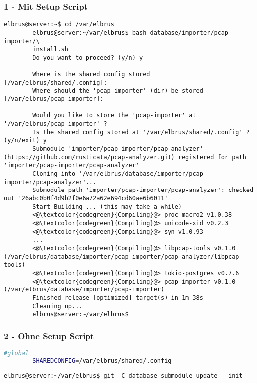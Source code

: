 \documentclass{article}
\begin{document}
	\subsubsection{1 - Mit Setup Script}
	\begin{lstlisting}[caption={Ausführen des 'install.sh' Scripts.}, breaklines=true,]
		elbrus@server:~$ cd /var/elbrus
		elbrus@server:~/var/elbrus$ bash database/importer/pcap-importer/\
		install.sh
		Do you want to proceed? (y/n) y
		
		Where is the shared config stored [/var/elbrus/shared/.config]: 
		Where should the 'pcap-importer' (dir) be stored [/var/elbrus/pcap-importer]: 
		
		Would you like to store the 'pcap-importer' at '/var/elbrus/pcap-importer' ?
		Is the shared config stored at '/var/elbrus/shared/.config' ? (y/n/exit) y
		Submodule 'importer/pcap-importer/pcap-analyzer' (https://github.com/rusticata/pcap-analyzer.git) registered for path 'importer/pcap-importer/pcap-analyzer'
		Cloning into '/var/elbrus/database/importer/pcap-importer/pcap-analyzer'...
		Submodule path 'importer/pcap-importer/pcap-analyzer': checked out '26abc0b0f4d9b2f0e6a72a62e694cd60ae6b6011'
		Start Building ... (this may take a while)
		<@\textcolor{codegreen}{Compiling}@> proc-macro2 v1.0.38
		<@\textcolor{codegreen}{Compiling}@> unicode-xid v0.2.3
		<@\textcolor{codegreen}{Compiling}@> syn v1.0.93
		...
		<@\textcolor{codegreen}{Compiling}@> libpcap-tools v0.1.0 (/var/elbrus/database/importer/pcap-importer/pcap-analyzer/libpcap-tools)
		<@\textcolor{codegreen}{Compiling}@> tokio-postgres v0.7.6
		<@\textcolor{codegreen}{Compiling}@> pcap-importer v0.1.0 (/var/elbrus/database/importer/pcap-importer)
		Finished release [optimized] target(s) in 1m 38s
		Cleaning up...
		elbrus@server:~/var/elbrus$
	\end{lstlisting}
	
	\newpage
	\subsubsection{2 - Ohne Setup Script}	
	\lstset{style=files}
	\begin{lstlisting}[caption={Anhand von '.env.example' eigene '.env' Datei anlegen.}, language=bash]
		#global
		SHAREDCONFIG=/var/elbrus/shared/.config
	\end{lstlisting}

	\lstset{style=commands}

	\begin{lstlisting}[caption={Updaten der git Submodule.}]
		elbrus@server:~/var/elbrus$ git -C database submodule update --init
	\end{lstlisting}
\end{document}
